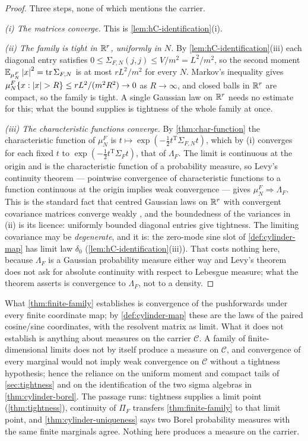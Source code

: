 \begin{proof}
Three steps, none of which mentions the carrier.

\emph{(i) The matrices converge.} This is \cref{lem:hC-identification}(i).

\emph{(ii) The family is tight in $\mathbb{R}^r$, uniformly in $N$.} By
\cref{lem:hC-identification}(iii) each diagonal entry satisfies
$0\le\Sigma_{F,N}(j,j)\le V/m^{2}=L^{2}/m^{2}$, so the second moment
$\mathbb{E}_{\mu_N^F}\left| x \right|^{2}=\operatorname{tr}\Sigma_{F,N}$ is at most
$rL^{2}/m^{2}$ for every $N$. Markov's inequality gives
$\mu_N^F\{x:\abs{x}>R\}\le rL^{2}/(m^{2}R^{2})\to0$ as $R\to\infty$, and
closed balls in $\mathbb{R}^r$ are compact, so the family is tight. A single Gaussian
law on $\mathbb{R}^r$ needs no estimate for this; what the bound supplies is tightness
of the whole family at once.

\emph{(iii) The characteristic functions converge.} By
\cref{thm:char-function} the characteristic function of $\mu_N^F$ is
$t\mapsto\exp(-\tfrac12t^{\mathrm T}\Sigma_{F,N}t)$, which by (i) converges for
each fixed $t$ to $\exp(-\tfrac12t^{\mathrm T}\Sigma_Ft)$, that of $\Lambda_F$.
The limit is continuous at the origin and is the characteristic function of a
probability measure, so Levy's continuity theorem --- pointwise convergence of
characteristic functions to a function continuous at the origin implies weak
convergence --- gives $\mu_N^F\Rightarrow\Lambda_F$. This is the standard fact
that centred Gaussian laws on $\mathbb{R}^r$ with convergent covariance matrices
converge weakly \cite{bogachev1998}, and the boundedness of the variances in
(ii) is its licence: uniformly bounded diagonal entries give tightness.
The limiting covariance may be \emph{degenerate}, and it is: the zero-mode sine
slot of \cref{def:cylinder-map} has limit law $\delta_0$
(\cref{lem:hC-identification}(iii)). That costs nothing here, because
$\Lambda_F$ is a Gaussian probability measure either way and Levy's theorem does
not ask for absolute continuity with respect to Lebesgue measure; what the
theorem asserts is convergence to $\Lambda_F$, not to a density.
\end{proof}

What \cref{thm:finite-family} establishes is convergence of the pushforwards
under every finite coordinate map; by \cref{def:cylinder-map} these are the laws
of the paired cosine/sine coordinates, with the resolvent matrix as limit. What
it does not establish is anything about measures on the carrier $\mathcal C$. A
family of finite-dimensional limits does not by itself produce a measure on
$\mathcal C$, and convergence of every marginal would not imply weak
convergence on $\mathcal C$ without a tightness hypothesis; hence the reliance
on the uniform moment and compact tails of \cref{sec:tightness} and on the
identification of the two sigma algebras in \cref{thm:cylinder-borel}. The
passage runs: tightness supplies a limit point (\cref{thm:tightness}), continuity
of $\Pi_F$ transfers \cref{thm:finite-family} to that limit point, and
\cref{thm:cylinder-uniqueness} says two Borel probability measures with the same
finite marginals agree. Nothing here produces a measure on the carrier.

